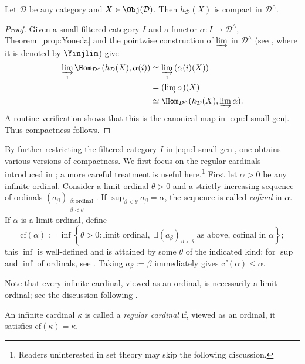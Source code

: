 \begin{proposition}\label{prop:Ind-cpt}
	Let $\mathcal{D}$ be any category and $X\in\Obj(\mathcal{D})$. Then $h_{\mathcal{D}}(X)$ is compact in $\mathcal{D}^\wedge$.
\end{proposition}
\begin{proof}
	Given a small filtered category $I$ and a functor $\alpha:I\to\mathcal{D}^\wedge$, Theorem~\ref{prop:Yoneda} and the pointwise construction of $\varinjlim$ in $\mathcal{D}^\wedge$ (see \cite[Proposition 2.7.8]{Li1}, where it is denoted by $\Yinjlim$) give
	\begin{align*}
		\varinjlim_i \Hom_{\mathcal{D}^{\wedge}}(h_{\mathcal{D}}(X), \alpha(i)) & \simeq \varinjlim_i \left(\alpha(i)(X)\right) \\
		& = (\varinjlim \alpha)(X) \\
		& \simeq \Hom_{\mathcal{D}^\wedge}(h_{\mathcal{D}}(X), \varinjlim \alpha).
	\end{align*}
	A routine verification shows that this is the canonical map in \eqref{eqn:I-small-gen}. Thus compactness follows.
\end{proof}

By further restricting the filtered category $I$ in \eqref{eqn:I-small-gen}, one obtains various versions of compactness. We first focus on the regular cardinals introduced in \cite[Definition 1.4.10]{Li1}; a more careful treatment is useful here.\footnote{Readers uninterested in set theory may skip the following discussion.} First let $\alpha>0$ be any infinite ordinal. Consider a limit ordinal $\theta>0$ and a strictly increasing sequence of ordinals $(a_\beta)_{\substack{\beta:\text{ordinal}\\\beta<\theta}}$. If $\sup_{\beta<\theta}a_\beta=\alpha$, the sequence is called \emph{cofinal} in $\alpha$. If $\alpha$ is a limit ordinal, define
\[ \mathrm{cf}(\alpha) := \inf\left\{ \theta > 0: \text{limit ordinal}, \; \exists (a_\beta)_{\beta < \theta}\; \text{as above, cofinal in $\alpha$} \right\}; \]
this $\inf$ is well-defined and is attained by some $\theta$ of the indicated kind; for $\sup$ and $\inf$ of ordinals, see \cite[Theorem 1.2.10]{Li1}. Taking $a_\beta:=\beta$ immediately gives $\mathrm{cf}(\alpha)\leq\alpha$.

Note that every infinite cardinal, viewed as an ordinal, is necessarily a limit ordinal; see the discussion following \cite[Lemma 1.4.6]{Li1}.

\begin{definition}\label{def:regular-cardinal}
	An infinite cardinal $\kappa$ is called a \emph{regular cardinal} if, viewed as an ordinal, it satisfies $\mathrm{cf}(\kappa)=\kappa$.
\end{definition}

